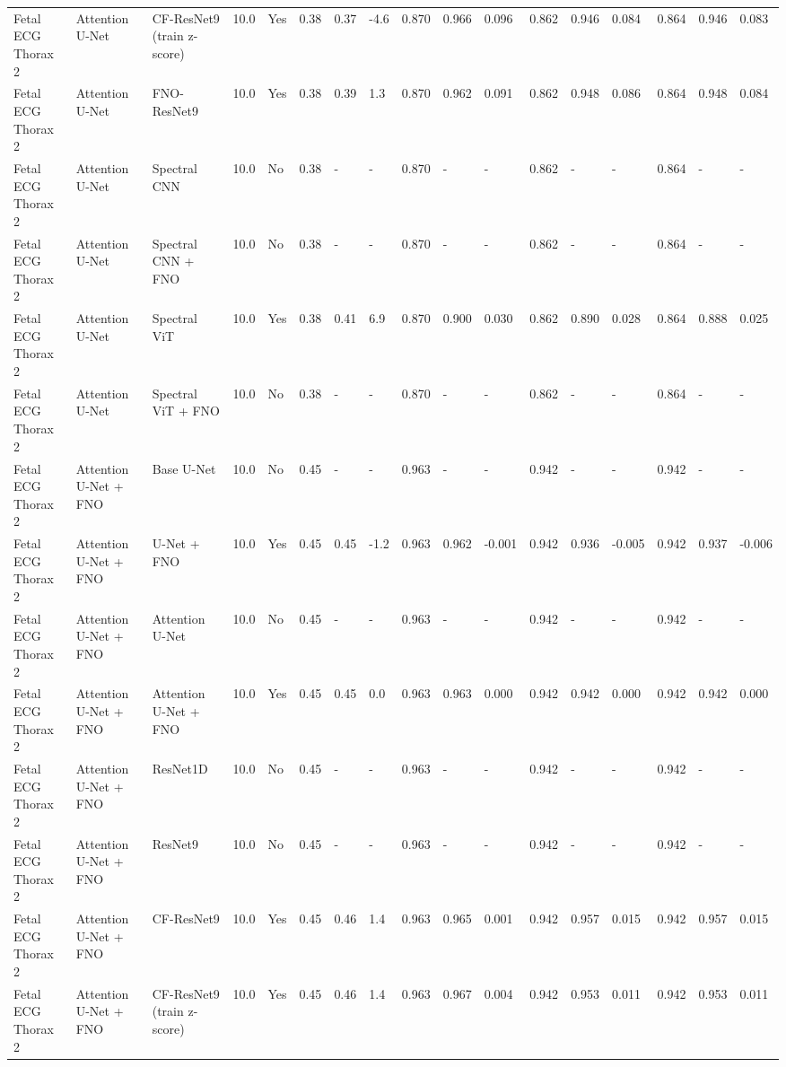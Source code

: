 \begin{longtable}{lllllllllllllllll}
Fetal ECG Thorax 2 & Attention U-Net & CF-ResNet9 (train z-score) & 10.0 & Yes & 0.38 & 0.37 & -4.6 & 0.870 & 0.966 & 0.096 & 0.862 & 0.946 & 0.084 & 0.864 & 0.946 & 0.083 \\
Fetal ECG Thorax 2 & Attention U-Net & FNO-ResNet9 & 10.0 & Yes & 0.38 & 0.39 & 1.3 & 0.870 & 0.962 & 0.091 & 0.862 & 0.948 & 0.086 & 0.864 & 0.948 & 0.084 \\
Fetal ECG Thorax 2 & Attention U-Net & Spectral CNN & 10.0 & No & 0.38 & - & - & 0.870 & - & - & 0.862 & - & - & 0.864 & - & - \\
Fetal ECG Thorax 2 & Attention U-Net & Spectral CNN + FNO & 10.0 & No & 0.38 & - & - & 0.870 & - & - & 0.862 & - & - & 0.864 & - & - \\
Fetal ECG Thorax 2 & Attention U-Net & Spectral ViT & 10.0 & Yes & 0.38 & 0.41 & 6.9 & 0.870 & 0.900 & 0.030 & 0.862 & 0.890 & 0.028 & 0.864 & 0.888 & 0.025 \\
Fetal ECG Thorax 2 & Attention U-Net & Spectral ViT + FNO & 10.0 & No & 0.38 & - & - & 0.870 & - & - & 0.862 & - & - & 0.864 & - & - \\
Fetal ECG Thorax 2 & Attention U-Net + FNO & Base U-Net & 10.0 & No & 0.45 & - & - & 0.963 & - & - & 0.942 & - & - & 0.942 & - & - \\
Fetal ECG Thorax 2 & Attention U-Net + FNO & U-Net + FNO & 10.0 & Yes & 0.45 & 0.45 & -1.2 & 0.963 & 0.962 & -0.001 & 0.942 & 0.936 & -0.005 & 0.942 & 0.937 & -0.006 \\
Fetal ECG Thorax 2 & Attention U-Net + FNO & Attention U-Net & 10.0 & No & 0.45 & - & - & 0.963 & - & - & 0.942 & - & - & 0.942 & - & - \\
Fetal ECG Thorax 2 & Attention U-Net + FNO & Attention U-Net + FNO & 10.0 & Yes & 0.45 & 0.45 & 0.0 & 0.963 & 0.963 & 0.000 & 0.942 & 0.942 & 0.000 & 0.942 & 0.942 & 0.000 \\
Fetal ECG Thorax 2 & Attention U-Net + FNO & ResNet1D & 10.0 & No & 0.45 & - & - & 0.963 & - & - & 0.942 & - & - & 0.942 & - & - \\
Fetal ECG Thorax 2 & Attention U-Net + FNO & ResNet9 & 10.0 & No & 0.45 & - & - & 0.963 & - & - & 0.942 & - & - & 0.942 & - & - \\
Fetal ECG Thorax 2 & Attention U-Net + FNO & CF-ResNet9 & 10.0 & Yes & 0.45 & 0.46 & 1.4 & 0.963 & 0.965 & 0.001 & 0.942 & 0.957 & 0.015 & 0.942 & 0.957 & 0.015 \\
Fetal ECG Thorax 2 & Attention U-Net + FNO & CF-ResNet9 (train z-score) & 10.0 & Yes & 0.45 & 0.46 & 1.4 & 0.963 & 0.967 & 0.004 & 0.942 & 0.953 & 0.011 & 0.942 & 0.953 & 0.011 \\

\end{longtable}
